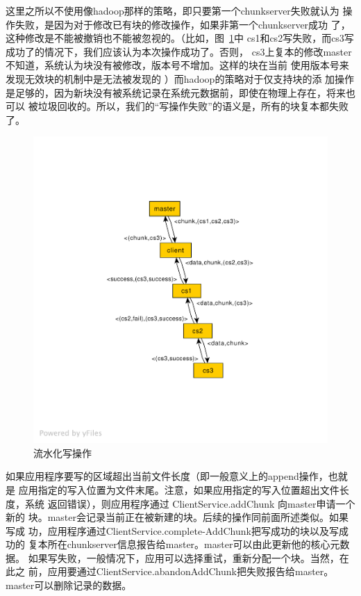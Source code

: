\documentclass[11pt,a4paper]{scrartcl}
\begin{document}
\begin{CJK*}{UTF8}{gbsn}
这里之所以不使用像hadoop那样的策略，即只要第一个chunkserver失败就认为
操作失败，是因为对于修改已有块的修改操作，如果非第一个chunkserver成功
了，这种修改是不能被撤销也不能被忽视的。{\color{red}（比如，图~\ref{fig:write}中
cs1和cs2写失败，而cs3写成功了的情况下，我们应该认为本次操作成功了。否则，
cs3上复本的修改master不知道，系统认为块没有被修改，版本号不增加。这样的块在当前
使用版本号来发现无效块的机制中是无法被发现的
）而hadoop的策略对于仅支持块的添
加操作是足够的，因为新块没有被系统记录在系统元数据前，即使在物理上存在，将来也可以
被垃圾回收的。所以，我们的“写操作失败”的语义是，所有的块复本都失败了。}
\begin{figure}
  \centering
\includegraphics{tfswrite}  
  \caption{流水化写操作}
  \label{fig:write}
\end{figure}

如果应用程序要写的区域超出当前文件长度（{\color{red}即一般意义上的append操作，也就是
应用指定的写入位置为文件末尾。注意，如果应用指定的写入位置超出文件长度，系统
返回错误}），则应用程序通过
ClientService.addChunk
向master申请一个新的
块。master会记录当前正在被新建的块。后续的操作同前面所述类似。如果写成
功，应用程序通过ClientService.complete-AddChunk把写成功的块以及写成功的
复本所在chunkserver信息报告给master。master可以由此更新他的核心元数据。
如果写失败，一般情况下，应用可以选择重试，重新分配一个块。当然，在此之
前，应用要通过ClientService.abandonAddChunk把失败报告给master。
master可以删除记录的数据。

\end{CJK*}
\end{document}

